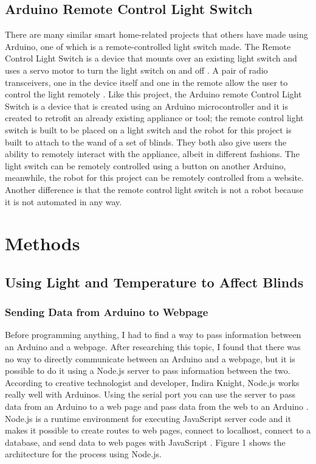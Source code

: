 \documentclass[10pt,twocolumn]{article}
\begin{document}
\subsection{Arduino Remote Control Light Switch}
There are many similar smart home-related projects that others have made using Arduino, one of which is a remote-controlled light switch made. The Remote Control Light Switch is a device that mounts over an existing light switch and uses a servo motor to turn the light switch on and off \cite{MerrittRemoteControlLightSwitch}. A pair of radio transceivers, one in the device itself and one in the remote allow the user to control the light remotely \cite{MerrittRemoteControlLightSwitch}. Like this project, the Arduino remote Control Light Switch is a device that is created using an Arduino microcontroller and it is created to retrofit an already existing appliance or tool; the remote control light switch is built to be placed on a light switch and the robot for this project is built to attach to the wand of a set of blinds. They both also give users the ability to remotely interact with the appliance, albeit in different fashions. The light switch can be remotely controlled using a button on another Arduino, meanwhile, the robot for this project can be remotely controlled from a website. Another difference is that the remote control light switch is not a robot because it is not automated in any way.


\section{Methods}
\subsection{Using Light and Temperature to Affect Blinds}
\subsubsection{Sending Data from Arduino to Webpage}
Before programming anything, I had to find a way to pass information between an Arduino and a webpage. After researching this topic, I found that there was no way to directly communicate between an Arduino and a webpage, but it is possible to do it using a Node.js server to pass information between the two. According to creative technologist and developer, Indira Knight, Node.js works really well with Arduinos. Using the serial port you can use the server to pass data from an Arduino to a web page and pass data from the web to an Arduino \cite{Knight2018ConnectingArduino}. Node.js is a runtime environment for executing JavaScript server code and it makes it possible to create routes to web pages, connect to localhost, connect to a database, and send data to web pages with JavaScript \cite{Knight2018ConnectingArduino}. Figure 1 shows  the architecture for the process using Node.js.
\end{document}

